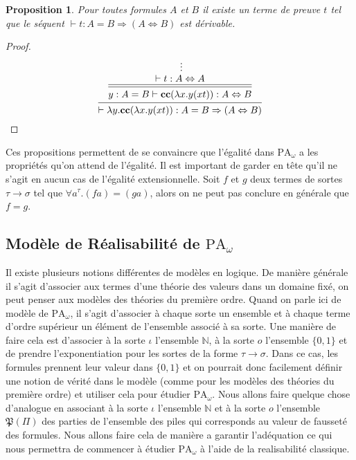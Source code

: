 \documentclass[a4paper,12pt]{article}
\newtheorem{prop}[theo]{Proposition}
\theoremstyle{rmqstyle}
\newcommand{\N}{\mathbb{N}}
\newcommand{\set}[1]{\{#1\}}
\newcommand{\PA}{\mathrm{PA}}
\renewcommand{\implies}{\Rightarrow}
\renewcommand{\P}{\mathfrak{P}}
\renewcommand{\iff}{\Leftrightarrow}
\newcommand{\cc}{\mathbf{cc}}
\begin{document}
\begin{prop}
Pour toutes formules $A$ et $B$ il existe un terme de preuve $t$ tel que le séquent $\vdash t : A = B \implies (A \iff B)$ est dérivable.
\end{prop}

\begin{proof}
$$
\begin{prooftree}[center=false]
\hypo{}
\ellipsis{}{ \vdash t : A \iff A }
\infer[double]1{y : A = B \vdash \cc(\lambda x. y(xt)) : A \iff B}
\infer1{\vdash \lambda y. \cc(\lambda x. y(xt)) : A = B \implies (A \iff B)}
\end{prooftree}
$$
\end{proof}

Ces propositions permettent de se convaincre que l'égalité dans $\PA_\omega$ a les propriétés qu'on attend de l'égalité. Il est important de garder en tête qu'il ne s'agit en aucun cas de l'égalité extensionnelle. Soit $f$ et $g$ deux termes de sortes $\tau \to \sigma$ tel que $\forall a^\tau. (fa) = (ga)$, alors on ne peut pas conclure en générale que $f = g$. 

\clearpage
\subsection{Modèle de Réalisabilité de \( \PA_\omega \)}

Il existe plusieurs notions différentes de modèles en logique. De manière générale il s'agit d'associer aux termes d'une théorie des valeurs dans un domaine fixé, on peut penser aux modèles des théories du première ordre. Quand on parle ici de modèle de $\PA_\omega$, il s'agit d'associer à chaque sorte un ensemble et à chaque terme d'ordre supérieur un élément de l'ensemble associé à sa sorte. Une manière de faire cela est d'associer à la sorte $\iota$ l'ensemble $\N$, à la sorte $o$ l'ensemble $\set{0,1}$ et de prendre l'exponentiation  pour les sortes de la forme $\tau \to \sigma$. Dans ce cas, les formules prennent leur valeur dans $\set{0,1}$ et on pourrait donc facilement définir une notion de vérité dans le modèle (comme pour les modèles des théories du première ordre) et utiliser cela pour étudier $\PA_\omega$. Nous allons faire quelque chose d'analogue en associant à la sorte $\iota$ l'ensemble $\N$ et à la sorte $o$ l'ensemble $\P(\Pi)$ des parties de l'ensemble des piles qui corresponds au valeur de fausseté des formules. Nous allons faire cela de manière a garantir l'adéquation ce qui nous permettra de commencer à étudier $\PA_\omega$ à l'aide de la realisabilité classique. 
\end{document}
